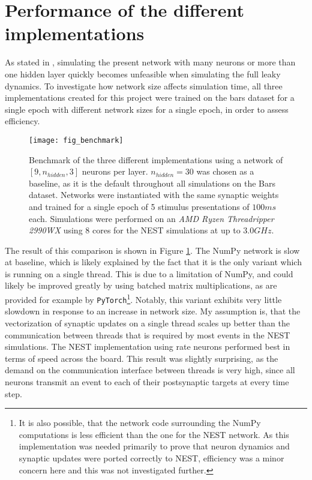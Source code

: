 \section{Performance of the different implementations}

As stated in \cite{Haider2021}, simulating the present network with many neurons or more than one hidden layer quickly
becomes unfeasible when simulating the full leaky dynamics. To investigate how network size affects simulation time, all
three implementations created for this project were trained on the bars dataset for a single epoch with different
network sizes for a single epoch, in order to assess efficiency.


\begin{figure}[t]
    \centering
    \texttt{[image: fig\_benchmark]}
    \caption{Benchmark of the three different implementations using a network of $[9, n_{hidden}, 3]$ neurons per layer.
        $n_{hidden}=30$ was chosen as a baseline, as it is the default throughout all simulations on the Bars dataset.
        Networks were instantiated with the same synaptic weights and trained for a single epoch of 5 stimulus
        presentations of $100ms$ each. Simulations were performed on an \textit{AMD Ryzen Threadripper 2990WX} using 8
        cores for the NEST simulations at up to $3.0GHz$.}
    \label{fig-benchmark}
\end{figure}

The result of this comparison is shown in Figure \ref{fig-benchmark}. The NumPy network is slow at baseline, which is
likely explained by the fact that it is the only variant which is running on a single thread. This is due to a
limitation of NumPy, and could likely be improved greatly by using batched matrix multiplications, as are provided for
example by \texttt{PyTorch}\footnote{It is also possible, that the network code surrounding the NumPy computations is
less efficient than the one for the NEST network. As this implementation was needed primarily to prove that neuron
dynamics and synaptic updates were ported correctly to NEST, efficiency was a minor concern here and this was not
investigated further.}.  Notably, this variant exhibits very little slowdown in response to an increase in network size.
My assumption is, that the vectorization of synaptic updates on a single thread scales up better than the communication
between threads that is required by most events in the NEST simulations. The NEST implementation using rate neurons
performed best in terms of speed across the board. This result was slightly surprising, as the demand on the
communication interface between threads is very high, since all neurons transmit an event to each of their postsynaptic
targets at every time step.

